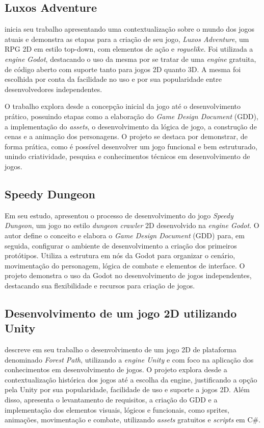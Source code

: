 \subsection{Luxos Adventure}

 inicia seu trabalho apresentando uma contextualização sobre o mundo dos jogos atuais e demonstra as etapas para a criação de seu jogo, \textit{Luxos Adventure}, um RPG 2D em estilo top-down, com elementos de ação e \textit{roguelike}. Foi utilizada a \textit{engine Godot}, destacando o uso da mesma por se tratar de uma \textit{engine} gratuita, de código aberto com suporte tanto para jogos 2D quanto 3D. A mesma foi escolhida por conta da facilidade no uso e por sua popularidade entre desenvolvedores independentes.

O trabalho explora desde a concepção inicial da jogo até o desenvolvimento prático, possuindo etapas como a elaboração do \textit{Game Design Document }(GDD), a implementação do \textit{assets}, o desenvolvimento da lógica de jogo, a construção de cenas e a animação dos personagens. O projeto se destaca por demonstrar, de forma prática, como é possível desenvolver um jogo funcional e bem estruturado, unindo criatividade, pesquisa e conhecimentos técnicos em desenvolvimento de jogos.


\subsection{Speedy Dungeon}

Em seu estudo,  apresentou o processo de desenvolvimento do jogo \textit{Speedy Dungeon}, um jogo no estilo \textit{dungeon crawler} 2D desenvolvido na \textit{engine Godot}. O autor define o conceito e elabora o \textit{Game Design Document }(GDD) para, em seguida, configurar o ambiente de desenvolvimento a criação dos primeiros protótipos. Utiliza a estrutura em nós da Godot para organizar o cenário, movimentação do personagem, lógica de combate e elementos de interface. O projeto demonstra o uso da Godot no desenvolvimento de jogos independentes, destacando sua flexibilidade e recursos para criação de jogos.

\subsection{Desenvolvimento de um jogo 2D utilizando Unity}

 descreve em seu trabalho o desenvolvimento de um jogo 2D de plataforma denominado \textit{Forest Path}, utilizando a \textit{engine Unity} e com foco na aplicação dos conhecimentos  em desenvolvimento de jogos. O projeto explora desde a contextualização histórica dos jogos até a escolha da engine, justificando a opção pela Unity por sua popularidade, facilidade de uso e suporte a jogos 2D. Além disso, apresenta o levantamento de requisitos, a criação do GDD e a implementação dos elementos visuais, lógicos e funcionais, como sprites, animações, movimentação e combate, utilizando \textit{assets} gratuitos e \textit{scripts} em C\#.
